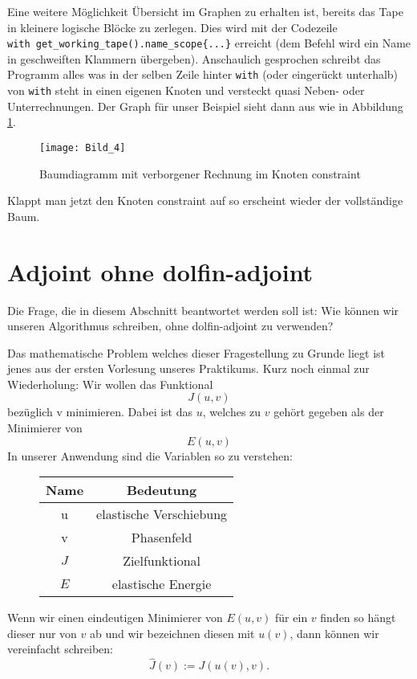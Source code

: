 \documentclass[a4paper, 12pt]{scrartcl}
\newcommand{\Jhat}{\widehat{J}}
\begin{document}
	Eine weitere Möglichkeit Übersicht im Graphen zu erhalten ist, bereits das Tape in kleinere logische Blöcke zu zerlegen. Dies wird mit der Codezeile \\ \verb|with get_working_tape().name_scope{...}| erreicht (dem Befehl wird ein Name in geschweiften Klammern übergeben). Anschaulich gesprochen schreibt das Programm alles was in der selben Zeile hinter \verb|with| (oder eingerückt unterhalb) von \verb|with| steht in einen eigenen Knoten und versteckt quasi Neben- oder Unterrechnungen. Der Graph für unser Beispiel sieht dann aus wie in Abbildung \ref{Abb_4}.
	\begin{figure}[H]
		\centering
		\texttt{[image: Bild\_4]}
		\caption{Baumdiagramm mit verborgener Rechnung im Knoten constraint}
		\label{Abb_4}
	\end{figure}
	Klappt man jetzt den Knoten \glqq constraint\grqq{} auf so erscheint wieder der vollständige Baum.


	\section{Adjoint ohne dolfin-adjoint}
	Die Frage, die in diesem Abschnitt beantwortet werden soll ist: Wie können wir unseren Algorithmus schreiben, ohne dolfin-adjoint zu verwenden?
	
	Das mathematische Problem welches dieser Fragestellung zu Grunde liegt ist jenes aus der ersten Vorlesung unseres Praktikums. Kurz noch einmal zur Wiederholung: Wir wollen das Funktional
	\[
		J (u,v)
	\]
	bezüglich v minimieren. Dabei ist das $u$, welches zu $v$ gehört gegeben als der Minimierer von
	\[
		E(u,v)
	\]
	In unserer Anwendung sind die Variablen so zu verstehen:
	\begin{figure}[H]
		\centering
	\begin{tabular}[h]{c|c}
		Name & Bedeutung \\ \hline
		u & elastische Verschiebung
		\\
		v & Phasenfeld
		\\
		$J$ & Zielfunktional
		\\
		$E$ & elastische Energie
	\end{tabular}
\end{figure}
	Wenn wir einen eindeutigen Minimierer von $E(u,v)$ für ein $v$ finden so hängt dieser nur von $v$ ab und wir bezeichnen diesen mit $u(v)$, dann können wir vereinfacht schreiben: 
	\begin{equation*}
		\Jhat(v):=J(u(v),v).
	\end{equation*}
	
\end{document}
